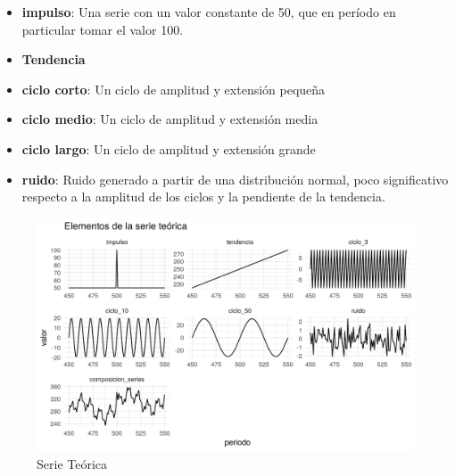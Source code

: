 \documentclass[a4paper]{article}
\begin{document}
\begin{itemize}
	\item \textbf{impulso}: Una serie con un valor constante de 50, que en período en particular tomar el valor 100.
	\item \textbf{Tendencia}
	\item \textbf{ciclo corto}: Un ciclo de amplitud y extensión pequeña
	\item \textbf{ciclo medio}: Un ciclo de amplitud y extensión media
	\item \textbf{ciclo largo}: Un ciclo de amplitud y extensión grande
	\item \textbf{ruido}: Ruido generado a partir de una distribución normal, poco significativo respecto a la amplitud de los ciclos y la pendiente de la tendencia.
\end{itemize}

\begin{figure}[H]
	\centering
	\includegraphics[width=\linewidth]{serie_teorica.PNG}
	\caption{Serie Teórica} \label{fig:serie_teorica}
\end{figure}
\end{document}
